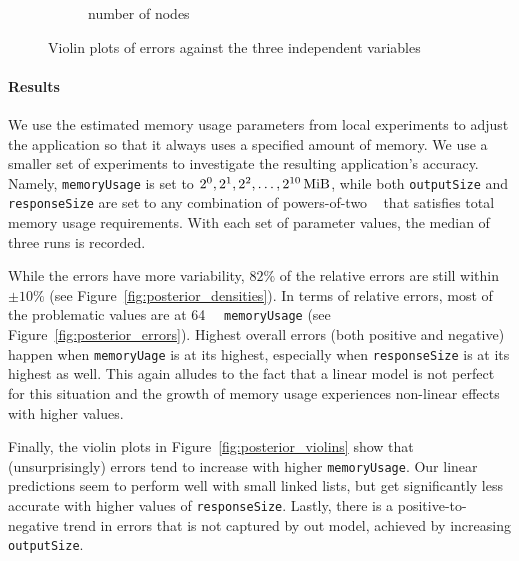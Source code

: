 \documentclass{article}
\begin{document}
\begin{figure}
\begin{subfigure}[t]{0.49\textwidth}
    \caption{number of nodes}
  \end{subfigure}
  \caption{Violin plots of errors against the three independent variables}
  \label{fig:prediction_violins}
\end{figure}

\paragraph{Results}

We use the estimated memory usage parameters from local experiments to adjust
the application so that it always uses a specified amount of memory. We use a
smaller set of experiments to investigate the resulting application's accuracy.
Namely, \texttt{memoryUsage} is set to $2^0, 2^1, 2^2, \dots,
\SI[exponent-base = 2]{e10}{\mebi\byte}$, while both \texttt{outputSize} and
\texttt{responseSize} are set to any combination of powers-of-two
\si{\mebi\byte} that satisfies total memory usage requirements. With each set of
parameter values, the median of three runs is recorded.

While the errors have more variability, $82\%$ of the relative errors are still
within $\pm10\%$ (see Figure~\ref{fig:posterior_densities}). In terms of
relative errors, most of the problematic values are at \SI{64}{\mebi\byte}
\texttt{memoryUsage} (see Figure~\ref{fig:posterior_errors}). Highest overall
errors (both positive and negative) happen when \texttt{memoryUage} is at its
highest, especially when \texttt{responseSize} is at its highest as well. This
again alludes to the fact that a linear model is not perfect for this situation
and the growth of memory usage experiences non-linear effects with higher
values.

Finally, the violin plots in Figure~\ref{fig:posterior_violins} show that
(unsurprisingly) errors tend to increase with higher \texttt{memoryUsage}. Our
linear predictions seem to perform well with small linked lists, but get
significantly less accurate with higher values of \texttt{responseSize}. Lastly,
there is a positive-to-negative trend in errors that is not captured by out
model, achieved by increasing \texttt{outputSize}.
\end{document}
